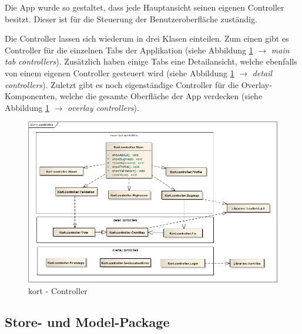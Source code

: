 Die App wurde so gestaltet, dass jede Hauptansicht seinen eigenen Controller besitzt.
Dieser ist für die Steuerung der Benutzeroberfläche zuständig.

Die Controller lassen sich wiederum in drei Klasen einteilen.
Zum einen gibt es Controller für die einzelnen Tabs der Applikation (siehe Abbildung \ref{kort-controller} $\rightarrow$ \emph{main tab controllers}).
Zusätzlich haben einige Tabs eine Detailansicht, welche ebenfalls von einem eigenen Controller gesteuert wird (siehe Abbildung \ref{kort-controller} $\rightarrow$ \emph{detail controllers}).
Zuletzt gibt es noch eigenständige Controller für die Overlay-Komponenten, welche die gesamte Oberfläche der App verdecken (siehe Abbildung \ref{kort-controller} $\rightarrow$ \emph{overlay controllers}).

\begin{figure}[H]
	\centering
	\includegraphics[width=\textwidth]{images/uml/kort-classdiagram-controller}
	\caption{kort - Controller}
	\label{kort-controller}
\end{figure}

\subsection{Store- und Model-Package}

